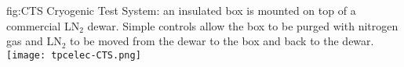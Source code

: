 \begin{dunefigure}
{fig:CTS}
{Cryogenic Test System: an insulated box is mounted on top of a commercial LN$_2$ dewar.  Simple controls allow the box to be purged with nitrogen gas and LN$_2$ to be moved from the dewar to the box and back to the dewar.}
\texttt{[image: tpcelec-CTS.png]}
\end{dunefigure}
